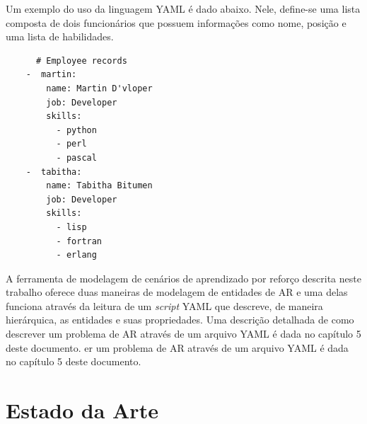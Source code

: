 \documentclass[cic,tc]{iiufrgs}
\begin{document}
    
    
    Um exemplo do uso da linguagem YAML é dado abaixo. Nele, define-se uma lista composta de dois
    funcionários que possuem informações como nome, posição e uma lista de habilidades.
    
    \begin{verbatim}
      # Employee records
    -  martin:
        name: Martin D'vloper
        job: Developer
        skills:
          - python
          - perl
          - pascal
    -  tabitha:
        name: Tabitha Bitumen
        job: Developer
        skills:
          - lisp
          - fortran
          - erlang
    \end{verbatim}
    
    
    A ferramenta de modelagem de cenários de aprendizado por reforço descrita neste trabalho oferece duas maneiras de modelagem de entidades de AR e uma delas
    funciona através da leitura de um \textit{script} YAML que descreve, de maneira hierárquica, as entidades e suas propriedades. Uma descrição detalhada de como
    descrever um problema de AR através de um arquivo YAML é dada no capítulo 5 deste documento.
    er um problema de AR através de um arquivo YAML é dada no capítulo 5 deste documento.
    
    \chapter{Estado da Arte}
    
\end{document}
